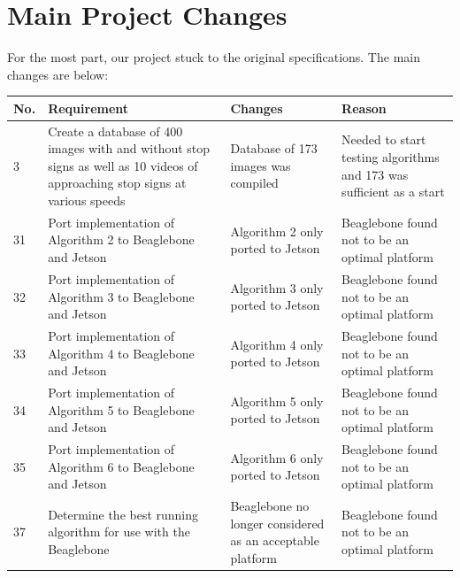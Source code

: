 \documentclass[letterpaper,10pt,titlepage]{article}
\begin{document}
\newpage

\section*{Main Project Changes}
For the most part, our project stuck to the original specifications. The main
changes are below:

\begin{center}
    \begin{tabular}{ | l | p{5cm} | p{5cm} | p{5cm} | }
    \hline
    No. & Requirement & Changes & Reason \\ \hline
    3 & Create a database of 400 images with and without stop signs as well as
    10 videos of approaching stop signs at various speeds & Database of 173
    images was compiled & Needed to start testing algorithms and 173 was
    sufficient as a start \\ \hline
    31 & Port implementation of Algorithm 2 to Beaglebone and Jetson & 
    Algorithm 2 only ported to Jetson & Beaglebone found not to be an optimal
    platform \\ \hline
    32 & Port implementation of Algorithm 3 to Beaglebone and Jetson & 
    Algorithm 3 only ported to Jetson & Beaglebone found not to be an optimal
    platform \\ \hline
    33 & Port implementation of Algorithm 4 to Beaglebone and Jetson & 
    Algorithm 4 only ported to Jetson & Beaglebone found not to be an optimal
    platform \\ \hline
    34 & Port implementation of Algorithm 5 to Beaglebone and Jetson & 
    Algorithm 5 only ported to Jetson & Beaglebone found not to be an optimal
    platform \\ \hline
    35 & Port implementation of Algorithm 6 to Beaglebone and Jetson & 
    Algorithm 6 only ported to Jetson & Beaglebone found not to be an optimal
    platform \\ \hline
    37 & Determine the best running algorithm for use with the Beaglebone &
    Beaglebone no longer considered as an acceptable platform & Beaglebone 
    found not to be an optimal platform \\ \hline
    \end{tabular}
\end{center}
\end{document}
